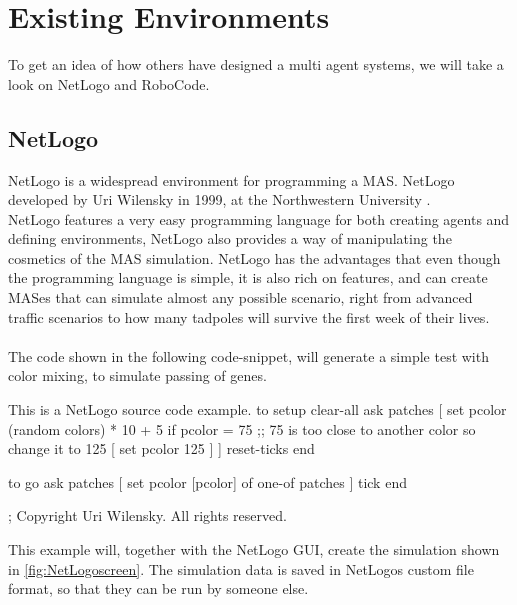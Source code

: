 \chapter{Existing Environments}
\label{sec:environments}

To get an idea of how others have designed a multi agent systems, we will take a look on NetLogo and RoboCode.\\

\section{NetLogo}
NetLogo is a widespread environment for programming a MAS. NetLogo developed by Uri Wilensky in 1999, at the Northwestern University \cite{misc:northwestern}.\\ 
\indent NetLogo features a very easy programming language for both creating agents and defining environments, NetLogo also provides a way of manipulating the cosmetics of the MAS simulation. NetLogo has the advantages that even though the programming language is simple, it is also rich on features, and can create MASes that can simulate almost any possible scenario, right from advanced traffic scenarios to how many tadpoles will survive the first week of their lives. \cite{misc:netlogolib} \\
\\
The code shown in the following code-snippet, will generate a simple test with color mixing, to simulate passing of genes.

\begin{NetLogo}{This is a NetLogo source code example.}{}
to setup
  clear-all
  ask patches
    [ set pcolor (random colors) * 10 + 5
        if pcolor = 75  ;; 75 is too close to another color so change it to 125
          [ set pcolor 125 ] ]
  reset-ticks
end

to go
  ask patches [ set pcolor [pcolor] of one-of patches ]
  tick
end


; Copyright Uri Wilensky. All rights reserved.
\end{NetLogo}

This example will, together with the NetLogo GUI, create the simulation shown in \ref{fig:NetLogoscreen}. The simulation data is saved in NetLogos custom file format, so that they can be run by someone else.


